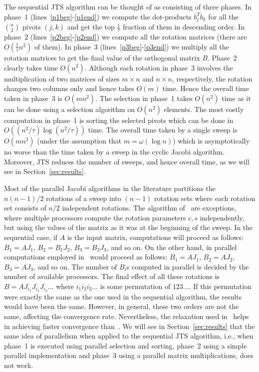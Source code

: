 \documentclass[10pt, conference, compsocconf]{IEEEtran}
\begin{document}
The sequential JTS algorithm can be thought of as consisting of three phases. In phase~1 (lines~\ref{p1beg}-\ref{p1end}) we compute the dot-products $b_j^Tb_k$ for all the ${n \choose 2}$ pivots $(j,k)$ and get the top $\frac{1}{\tau}$ fraction of them in descending order. In phase~2 (lines~\ref{p2beg}-\ref{p2end}) we compute all the rotation matrices (there are $O(\frac{1}{\tau}n^2 )$ of them). In phase~3 (lines~\ref{p3beg}-\ref{p3end}) we multiply all the rotation matrices to get the final value of the orthogonal matrix $B$. Phase~2 clearly takes time $O(n^2)$. Although each rotation in phase~3 involves the multiplication of two matrices of sizes $m\times n$ and $n \times n$, respectively, the rotation changes two columns only and hence takes $O(m)$ time. Hence the overall time taken in phase~3 is $O(mn^2)$. The selection in phase~1 takes $O(n^2)$ time as it can be done using a selection algorithm on $O(n^2)$ elements. The most costly computation in phase~1 is sorting the selected pivots which can be done in $O((n^2/\tau) \log{(n^2/\tau)})$ time. The overall time taken by a single sweep is $O(mn^2)$ (under the assumption that $m=\omega(\log n)$) which is asymptotically no worse than the time taken by a sweep in the cyclic Jacobi algorithm. Moreover, JTS reduces the number of sweeps, and hence overall time, as we will see in Section~\ref{sec:results}.

Most of the parallel Jacobi algorithms in the literature partitions the $n(n{-}1)/2$ rotations of a sweep into $(n{-}1)$ rotation sets where each rotation set consists of $n/2$ independent rotations. The algorithm of~\cite{strumpen2003stream, rajasekaran2008relaxation} are exceptions, where multiple processors compute the rotation parameters $c,s$ independently, but using the values of the matrix as it was at the beginning of the sweep. In the sequential case, if $A$ is the input matrix, computations will proceed as follows: $B_1 = A J_1$, $B_2 = B_1 J_2$, $B_3 = B_2 J_3$, and so on. On the other hand, in parallel computations employed in~\cite{strumpen2003stream, rajasekaran2008relaxation} would proceed as follows: $B_1 = A J_1$, $B_2 = A J_2$, $B_3 = A J_3$, and so on. The number of $B_i$s computed in parallel is decided by the number of available processors. The final effect of all these rotations is $B = A J_{i_1} J_{i_2} J_{i_3} \ldots$ where $i_1i_2i_3\ldots$ is some permutation of $123\ldots$. If this permutation were exactly the same as the one used in the sequential algorithm, the results would have been the same. However, in general, these two orders are not the same, affecting the convergence rate. Nevertheless, the relaxation used in~\cite{rajasekaran2008relaxation} helps in achieving faster convergence than~\cite{strumpen2003stream}. We will see in Section~\ref{sec:results} that the same idea of parallelism when applied to the sequential JTS algorithm, i.e., when phase~1 is executed using parallel selection and sorting, phase~2 using a simple parallel implementation and phase~3 using a parallel matrix multiplications, does not work.
\end{document}
